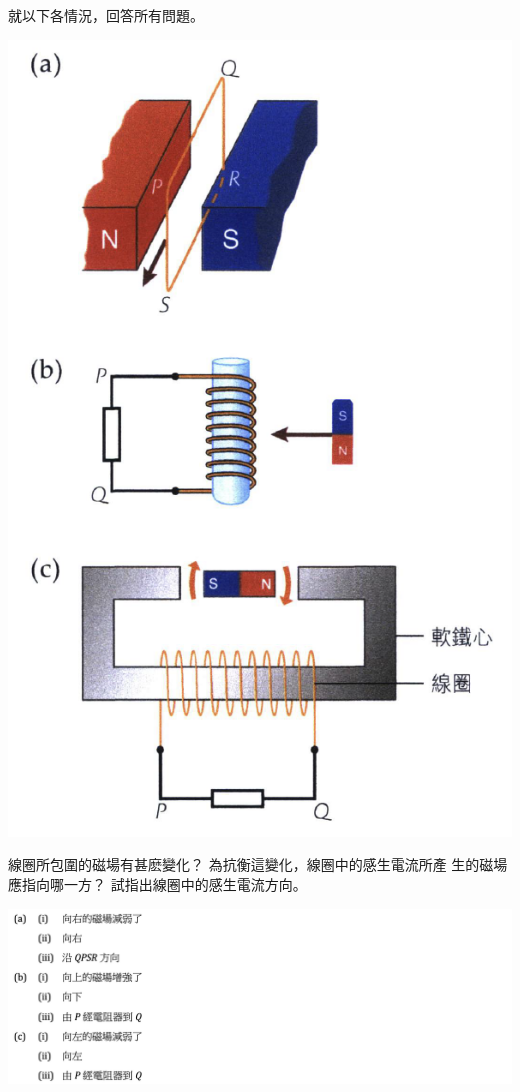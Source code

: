 {
    就以下各情況，回答所有問題。
    \par{\par\includegraphics[width=.35\textwidth]{./img/ch5_induction_lq_2024-06-24-17-25-22.png}\par}
    \begin{subparts}
        \subpart 線圈所包圍的磁場有甚麽變化？
        \subpart 為抗衡這變化，線圈中的感生電流所產 生的磁場應指向哪一方？
        \subpart 試指出線圈中的感生電流方向。
    \end{subparts}
    \par {}
}{\par{\par\centering\includegraphics[width=\textwidth]{./img/ch5_induction_lq_2024-06-24-17-36-30.png}\par}}

